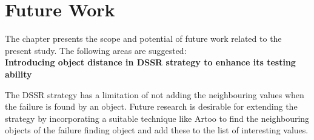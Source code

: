 
\chapter{Future Work}
\label{chap:futureWork}
	
The chapter presents the scope and potential of future work related to the present study. The following areas are suggested:\\


	
\textbf{Introducing object distance in DSSR strategy to enhance its testing ability}

The DSSR strategy has a limitation of not adding the neighbouring values when the failure is found by an object. Future research is desirable for extending the strategy by incorporating a suitable technique like Artoo to find the neighbouring objects of the failure finding object and add these to the list of interesting values.  \\


